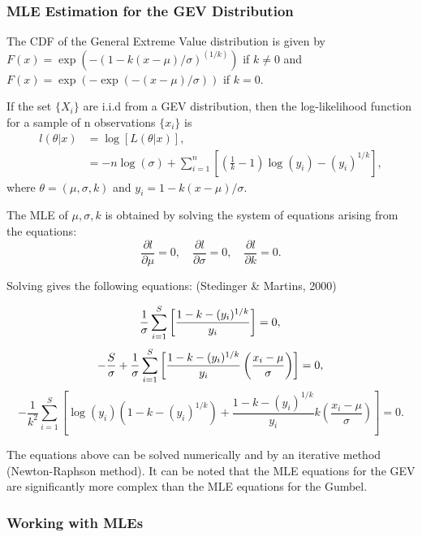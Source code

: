 \documentclass{article}
\begin{document}
\subsubsection{MLE Estimation for the GEV Distribution}

The CDF of the General Extreme Value distribution is given by $F(x)=\exp(-(1-k(x-\mu)/\sigma)^{(1/k)})$ if $k\neq 0$ and $F(x)=\exp(-\exp(-(x-\mu)/\sigma))$ if $k=0.$

If the set $\{X_i\}$ are i.i.d from a GEV distribution, then the log-likelihood function for a sample of n observations $\{x_i\}$ is
\begin{align*}
l(\theta |x)&= \log[L(\theta |x)],\\
			&= -n\log(\sigma) + \sum_{i=1}^{n}\left[\left(\frac{1}{k}-1\right)\log(y_i) -(y_i)^{1/k}\right],
\end{align*}
where $\theta = (\mu,\sigma,k)$ and $y_i= 1-k(x-\mu)/\sigma.$

The MLE of $\mu,\sigma, k$ is obtained by solving the system of equations arising from the equations:
$$\frac{\partial l}{\partial\mu}=0, \quad \frac{\partial l}{\partial\sigma} = 0, \quad \frac{\partial l}{\partial k}=0.$$

Solving gives the following equations: (Stedinger \& Martins, 2000)

\begin{equation}
\frac{1}{\sigma}\sum_{i=1}^{S}\left[\frac{1-k-(y_i)^{1/k}}{y_i}\right]=0,\label{MLEGEV1}\\
\end{equation}
\begin{equation}
-\frac{S}{\sigma} +\frac{1}{\sigma}\sum_{i=1}^{S}\left[\frac{1-k-(y_i)^{1/k}}{y_i}\left(\frac{x_i -\mu}{\sigma}\right)\right] = 0,\label{MLEGEV2}\\
\end{equation}
\begin{equation}
-\frac{1}{k^2}\sum_{i=1}^S\left[\log(y_i)\left(1-k-(y_i)^{1/k}\right) + \frac{1-k-(y_i)^{1/k}}{y_i}k\left(\frac{x_i-\mu}{\sigma}\right)\right]=0.\label{MLEGEV3}
\end{equation}

The equations above can be solved numerically and by an iterative method (Newton-Raphson method). It can be noted that the MLE equations for the GEV are significantly more complex than the MLE equations for the Gumbel.


\subsubsection{Working with MLEs}
\end{document}
